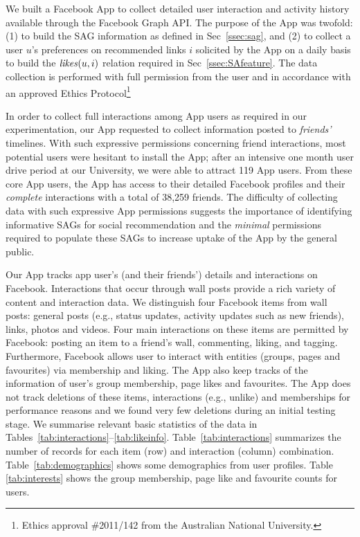 
We built a Facebook App to collect detailed user interaction and
activity history available through the Facebook Graph API.  The
purpose of the App was twofold: (1) to build the SAG information as
defined in Sec~\ref{ssec:sag}, and (2) to collect a user $u$'s preferences on
recommended links $i$ solicited by the App on a daily basis to build
the $\likes(u,i)$ relation required in Sec~\ref{ssec:SAfeature}.  The
data collection is performed with full permission from the user and in
accordance with an approved Ethics Protocol\footnote{Ethics approval 
\#2011/142 from the Australian National University.}

In order to collect full interactions among App users as required in
our experimentation, our App requested to collect information posted
to \emph{friends'} timelines.  With such expressive permissions
concerning friend interactions, most potential users were hesitant to
install the App; after an intensive one month user drive period at our
University, we were able to attract 119 App users.  From these core
App users, the App has access to their detailed Facebook profiles and
their \emph{complete} interactions with a total of 38,259 friends.
The difficulty of collecting data with such expressive App permissions
suggests the importance of identifying informative SAGs for social
recommendation and the \emph{minimal} permissions required to populate these
SAGs to increase uptake of the App by the general public.

Our App tracks app user's (and their friends') details and
interactions on Facebook.  Interactions that occur through wall posts
provide a rich variety of content and interaction data.  We
distinguish four Facebook items from wall posts: general posts (e.g.,
status updates, activity updates such as new friends), links, photos
and videos. Four main interactions on these items are permitted by
Facebook: posting an item to a friend's wall, commenting, liking, and
tagging. Furthermore, Facebook allows user to interact with entities
(groups, pages and favourites) via membership and liking. The App also
keep tracks of the information of user's group membership, page likes
and favourites.  The App does not track deletions of these items,
interactions (e.g., unlike) and memberships for performance reasons
and we found very few deletions during an initial testing stage.  We
summarise relevant basic statistics of the data in
Tables~\ref{tab:interactions}--\ref{tab:likeinfo}.
Table~\ref{tab:interactions} summarizes the number of records for each
item (row) and interaction (column)
combination. Table~\ref{tab:demographics} shows some demographics from
user profiles. Table \ref{tab:interests} shows the group membership,
page like and favourite counts for users.

